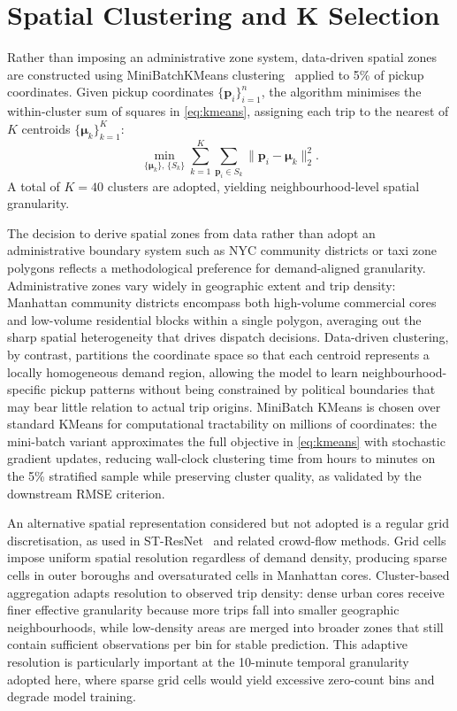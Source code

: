 \section{Spatial Clustering and K Selection}
\label{sec:spatial}

Rather than imposing an administrative zone system, data-driven spatial zones are constructed using MiniBatchKMeans clustering~\parencite{kmeans_mini} applied to 5\% of pickup coordinates. Given pickup coordinates $\{\mathbf{p}_i\}_{i=1}^{n}$, the algorithm minimises the within-cluster sum of squares in \eqref{eq:kmeans}, assigning each trip to the nearest of $K$ centroids $\{\boldsymbol{\mu}_k\}_{k=1}^{K}$:
\begin{equation}
 \min_{\{\boldsymbol{\mu}_k\},\,\{S_k\}}
 \sum_{k=1}^{K}\sum_{\mathbf{p}_i\in S_k}
 \bigl\|\mathbf{p}_i - \boldsymbol{\mu}_k\bigr\|_2^{2}.
 \label{eq:kmeans}
\end{equation}
A total of $K=40$ clusters are adopted, yielding neighbourhood-level spatial granularity.

The decision to derive spatial zones from data rather than adopt an administrative boundary system such as NYC community districts or taxi zone polygons reflects a methodological preference for demand-aligned granularity. Administrative zones vary widely in geographic extent and trip density: Manhattan community districts encompass both high-volume commercial cores and low-volume residential blocks within a single polygon, averaging out the sharp spatial heterogeneity that drives dispatch decisions. Data-driven clustering, by contrast, partitions the coordinate space so that each centroid represents a locally homogeneous demand region, allowing the model to learn neighbourhood-specific pickup patterns without being constrained by political boundaries that may bear little relation to actual trip origins. MiniBatch KMeans is chosen over standard KMeans for computational tractability on millions of coordinates: the mini-batch variant approximates the full objective in \eqref{eq:kmeans} with stochastic gradient updates, reducing wall-clock clustering time from hours to minutes on the 5\% stratified sample while preserving cluster quality, as validated by the downstream RMSE criterion.

An alternative spatial representation considered but not adopted is a regular grid discretisation, as used in ST-ResNet~\parencite{zhang2017deep} and related crowd-flow methods. Grid cells impose uniform spatial resolution regardless of demand density, producing sparse cells in outer boroughs and oversaturated cells in Manhattan cores. Cluster-based aggregation adapts resolution to observed trip density: dense urban cores receive finer effective granularity because more trips fall into smaller geographic neighbourhoods, while low-density areas are merged into broader zones that still contain sufficient observations per bin for stable prediction. This adaptive resolution is particularly important at the 10-minute temporal granularity adopted here, where sparse grid cells would yield excessive zero-count bins and degrade model training.

